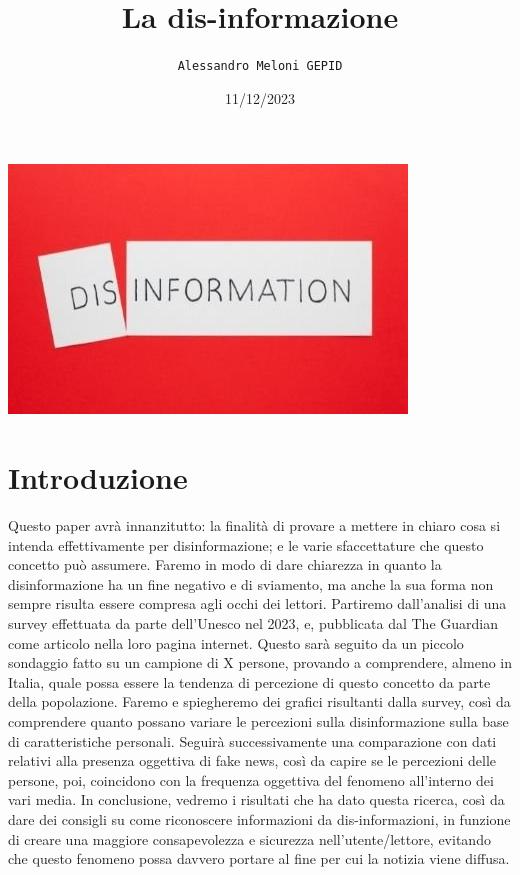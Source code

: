 \documentclass{article}
\title{\textbf{La dis-informazione}}
\author{\texttt{Alessandro Meloni GEPID}}
\date{11/12/2023}
\begin{document}
\maketitle
    \includegraphics[width = 0.6\linewidth]{Immagini/disinformation.jpeg}
\centering \tableofcontents
\newpage \section{Introduzione}
\flushleft
\begin{justify}
    Questo paper avrà innanzitutto: la finalità di provare a mettere in chiaro cosa si intenda effettivamente per disinformazione; e le varie sfaccettature che questo concetto può assumere.
    Faremo in modo di dare chiarezza in quanto la disinformazione ha un fine negativo e di sviamento, ma anche la sua forma non sempre risulta essere compresa agli occhi dei lettori.
    Partiremo dall'analisi di una survey effettuata da parte dell'Unesco nel 2023, e, pubblicata dal The Guardian come articolo nella loro pagina internet. Questo sarà seguito da un piccolo sondaggio fatto su un campione di X persone, provando a comprendere, almeno in Italia, quale possa essere la tendenza di percezione di questo concetto da parte della popolazione.
    Faremo e spiegheremo dei grafici risultanti dalla survey, così da comprendere quanto possano variare le percezioni sulla disinformazione sulla base di caratteristiche personali. 
    Seguirà successivamente una comparazione con dati relativi alla presenza oggettiva di fake news, così da capire se le percezioni delle persone, poi, coincidono con la frequenza oggettiva del fenomeno all'interno dei vari media.
    In conclusione, vedremo i risultati che ha dato questa ricerca, così da dare dei consigli su come riconoscere informazioni da dis-informazioni, in funzione di creare una maggiore consapevolezza e sicurezza nell'utente/lettore, evitando che questo fenomeno possa davvero portare al fine per cui la notizia viene diffusa.
    
\end{justify}
 
\end{document}
